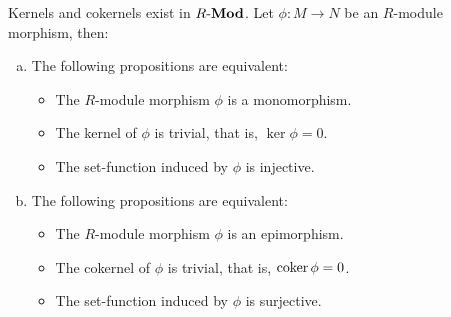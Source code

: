 \begin{proposition}
\label{prop:ker-coker-in-R-mod-properties}
Kernels and cokernels exist in \({R\text{-}\textbf{Mod}}\). Let \(\phi: M \to N\) be an
\(R\)-module morphism, then:
\begin{enumerate}[(a)]\setlength\itemsep{0em}
\item The following propositions are equivalent:
  \begin{itemize}\setlength\itemsep{0em}
  \item The \(R\)-module morphism \(\phi\) is a monomorphism.
  \item The kernel of \(\phi\) is trivial, that is, \(\ker \phi = 0\).
  \item The set-function induced by \(\phi\) is injective.
  \end{itemize}
\item The following propositions are equivalent:
  \begin{itemize}\setlength\itemsep{0em}
  \item The \(R\)-module morphism \(\phi\) is an epimorphism.
  \item The cokernel of \(\phi\) is trivial, that is, \(\operatorname{coker} \phi = 0\).
  \item The set-function induced by \(\phi\) is surjective.
  \end{itemize}
\end{enumerate}
\end{proposition}

